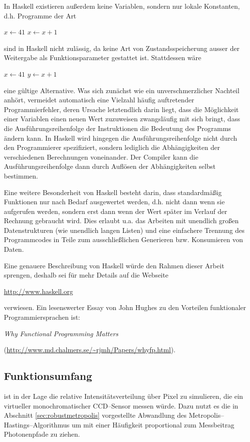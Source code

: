 	In Haskell existieren außerdem keine Variablen, sondern nur lokale Konstanten, d.h. Programme der Art
		\begin{algorithmic}
			\STATE $x\leftarrow 41$
			\STATE $x\leftarrow x+1$
		\end{algorithmic}
	sind in Haskell nicht zulässig, da keine Art von Zustandsspeicherung ausser der Weitergabe als Funktionsparameter gestattet ist. Stattdessen wäre
		\begin{algorithmic}
			\STATE $x\leftarrow 41$
			\STATE $y\leftarrow x+1$
		\end{algorithmic}
	eine gültige Alternative. Was sich zunächst wie ein unverschmerzlicher Nachteil anhört, vermeidet automatisch eine Vielzahl häufig auftretender Programmierfehler, deren Ursache letztendlich darin liegt, dass die Möglichkeit einer Variablen einen neuen Wert zuzuweisen zwangsläufig mit sich bringt, dass die Ausführungsreihenfolge der Instruktionen die Bedeutung des Programms ändern kann. In Haskell wird hingegen die Ausführungsreihenfolge nicht durch den Programmierer spezifiziert, sondern lediglich die Abhängigkeiten der verschiedenen Berechnungen voneinander. Der Compiler kann die Aus\-führ\-ungs\-rei\-hen\-fol\-ge dann durch Auflösen der Abhängigkeiten selbst bestimmen.
	
	Eine weitere Besonderheit von Haskell besteht darin, dass standardmäßig Funktionen nur nach Bedarf ausgewertet werden, d.h. nicht dann wenn sie aufgerufen werden, sondern erst dann wenn der Wert später im Verlauf der Rechnung gebraucht wird. Dies erlaubt u.a. das Arbeiten mit unendlich großen Datenstrukturen (wie unendlich langen Listen) und eine einfachere Trennung des  Programmcodes in Teile zum ausschließlichen Generieren bzw. Konsumieren von Daten.
		
	Eine genauere Beschreibung von Haskell würde den Rahmen dieser Arbeit sprengen, deshalb sei für mehr Details auf die Webseite
	
	\url{http://www.haskell.org}
	
	verwiesen. Ein lesenswerter Essay von John Hughes zu den Vorteilen funktionaler Programmiersprachen ist:
	
	{\em Why Functional Programming Matters}
	
	(\url{http://www.md.chalmers.se/~rjmh/Papers/whyfp.html}).
	
	
	\subsection{Funktionsumfang}
	\pirate ist in der Lage die relative Intensitätsverteilung über Pixel zu simulieren, die ein virtueller monochromatischer CCD--Sensor messen würde. Dazu nutzt es die in Abschnitt \ref{sec:robustmetropolis} vorgestellte Abwandlung des Metropolis--Hastings--Algorithmus um mit einer Häufigkeit proportional zum Messbeitrag Photonenpfade zu ziehen.
	
